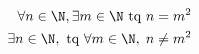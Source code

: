\begin{align*}
  \forall n \in \N, \exists m \in \N \text{ tq } n &= m^2 \\
  \exists n \in \N, \text{ tq } \forall m \in \N,\;  n &\neq m^2 
\end{align*}
